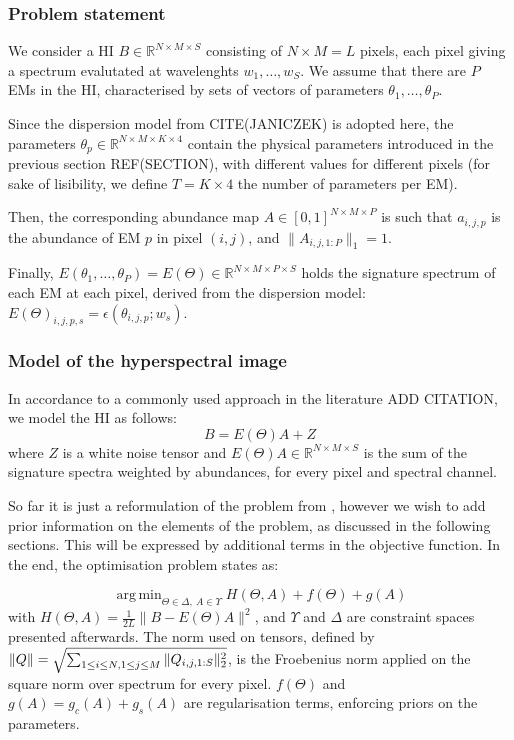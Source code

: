 \documentclass{article}
\DeclareMathOperator*{\argmin}{arg\,min}
\begin{document}
\subsubsection{Problem statement}

We consider a HI $B \in \mathbb{R}^{N \times M \times S}$ consisting of $N \times M = L$ pixels, each pixel giving a spectrum evalutated at wavelenghts $w_1,\dots, w_S$. We assume that there are $P$ EMs in the HI, characterised by sets of vectors of parameters $\theta_1,\dots, \theta_P$.

Since the dispersion model from CITE(JANICZEK) is adopted here, the parameters $\theta_p \in \mathbb{R}^{N \times M \times K \times 4}$ contain the physical parameters introduced in the previous section REF(SECTION), with different values for different pixels (for sake of lisibility, we define $T = K \times 4$ the number of parameters per EM).

Then, the corresponding abundance map $A \in [0, 1]^{N \times M\times P}$ is such that $a_{i, j, p}$ is the abundance of EM $p$ in pixel $(i, j)$, and $\|A_{i, j, 1:P}\|_1 = 1$.

Finally, $E(\theta_1,\dots, \theta_P) = E(\Theta) \in \mathbb{R}^{N \times M \times P \times S}$ holds the signature spectrum of each EM at each pixel, derived from the dispersion model: $E(\Theta)_{i, j, p, s} = \epsilon(\theta_{i, j, p}; w_s)$.

\subsubsection{Model of the hyperspectral image}

In accordance to a commonly used approach in the literature ADD CITATION, we model the HI as follows:
$$B = E(\Theta) A + Z$$
where $Z$ is a white noise tensor and $E(\Theta) A \in \mathbb{R}^{N \times M \times S}$ is the sum of the signature spectra weighted by abundances, for every pixel and spectral channel.

So far it is just a reformulation of the problem from \cite{janiczek_differentiable_2020}, however we wish to add prior information on the elements of the problem, as discussed in the following sections. This will be expressed by additional terms in the objective function. In the end, the optimisation problem states as:

\begin{equation}
  \label{eq:objective}
  \argmin_{\Theta \in \Delta,\ A \in \Upsilon} H(\Theta, A) + f(\Theta) + g(A)
\end{equation}
with $H(\Theta, A) = \frac{1}{2 L} \|B - E(\Theta) A\|^2$, and $\Upsilon$ and $\Delta$ are constraint spaces presented afterwards. The norm used on tensors, defined by $\|Q\| = \sqrt{\sum_{1 \leq i \leq N,\\1 \leq j \leq M} \|Q_{i, j, 1:S}\|_2^2}$, is the Froebenius norm applied on the square norm over spectrum for every pixel. $f(\Theta)$ and $g(A) = g_c(A) + g_s(A)$ are regularisation terms, enforcing priors on the parameters.
\end{document}
